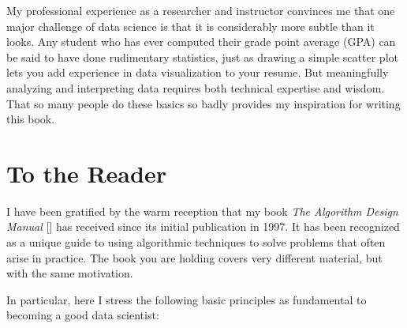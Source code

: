 \documentclass[10pt]{article}
\begin{document}
My professional experience as a researcher and instructor convinces me that one major challenge of data science is that it is considerably more subtle than it looks. Any student who has ever computed their grade point average (GPA) can be said to have done rudimentary statistics, just as drawing a simple scatter plot lets you add experience in data visualization to your resume. But meaningfully analyzing and interpreting data requires both technical expertise and wisdom. That so many people do these basics so badly provides my inspiration for writing this book.

\section*{To the Reader}
I have been gratified by the warm reception that my book \textit{The Algorithm Design Manual} [\cite{skiena2008algorithm}] has received since its initial publication in 1997. It has been recognized as a unique guide to using algorithmic techniques to solve problems that often arise in practice. The book you are holding covers very different material, but with the same motivation.

In particular, here I stress the following basic principles as fundamental to becoming a good data scientist:
\end{document}
